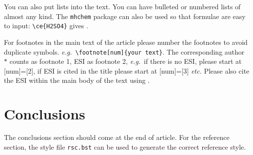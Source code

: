 \documentclass[twoside,twocolumn,9pt]{article}
\begin{document}
You can also put lists into the text. You can have bulleted or numbered lists of almost any kind. 
The \texttt{mhchem} package can also be used so that formulae are easy to input: \texttt{\textbackslash ce\{H2SO4\}} gives . 

For footnotes in the main text of the article please number the footnotes to avoid duplicate symbols. \textit{e.g.}\ \texttt{\textbackslash footnote[num]\{your text\}}. The corresponding author $\ast$ counts as footnote 1, ESI as footnote 2, \textit{e.g.}\ if there is no ESI, please start at [num]=[2], if ESI is cited in the title please start at [num]=[3] \textit{etc.} Please also cite the ESI within the main body of the text using \dag.

\section{Conclusions}
The conclusions section should come at the end of article. For the reference section, the style file \texttt{rsc.bst} can be used to generate the correct reference style.


\balance


\end{document}
